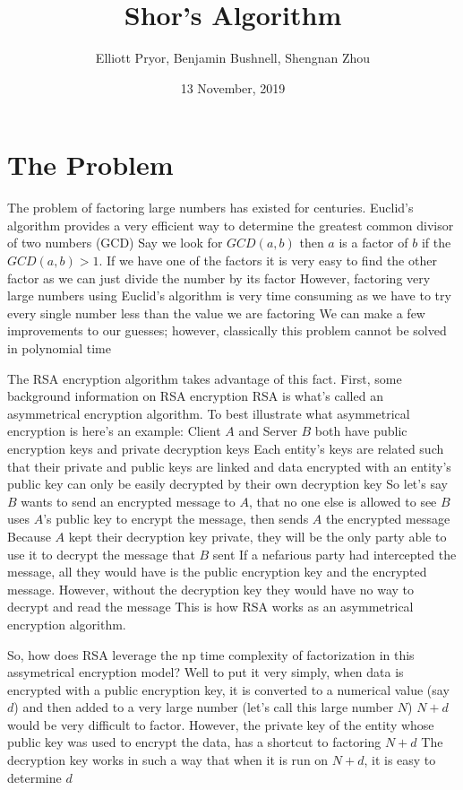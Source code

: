 \documentclass[a4paper]{article}
\title{Shor's Algorithm}
\author{Elliott Pryor, Benjamin Bushnell, Shengnan Zhou}
\date{13 November, 2019}
\begin{document}
\maketitle %

\section{The Problem}

The problem of factoring large numbers has existed for centuries. Euclid's algorithm provides a very efficient way to determine the greatest common divisor of two numbers (GCD)
 Say we look for $GCD(a,b)$ then $a$ is a factor of $b$ if the $GCD(a, b) > 1$. If we have one of the factors
 it is very easy to find the other factor as we can just divide the number by its factor
 However, factoring very large numbers using Euclid's algorithm is very time consuming as we have to try every single number less than the value we are factoring
 We can make a few improvements to our guesses; however, classically this problem cannot be solved in polynomial time


The RSA encryption algorithm takes advantage of this fact. First, some background information on RSA encryption
 RSA is what's called an asymmetrical encryption algorithm. To best illustrate what asymmetrical encryption is
 here's an example: Client $A$ and Server $B$ both have public encryption keys and private decryption keys
 Each entity's keys are related such that their private and public keys are linked
 and data encrypted with an entity's public key can only be easily decrypted by their own decryption key
 So let's say $B$ wants to send an encrypted message to $A$, that no one else is allowed to see
 $B$ uses $A$'s public key to encrypt the message, then sends $A$ the encrypted message
 Because $A$ kept their decryption key private, they will be the only party able to use it to decrypt the message that $B$ sent
 If a nefarious party had intercepted the message, all they would have is the public encryption key
 and the encrypted message. However, without the decryption key they would have no way to decrypt and read the message
 This is how RSA works as an asymmetrical encryption algorithm. \cite{ytRSA}




So, how does RSA leverage the np time complexity of factorization in this assymetrical encryption model? Well
 to put it very simply, when data is encrypted with a public encryption key, it is converted to a numerical value (say $d$) and then added to a very large number (let's call this large number $N$)
 $N+d$ would be very difficult to factor. However, the private key of the entity
 whose public key was used to encrypt the data, has a shortcut to factoring $N+d$
 The decryption key works in such a way that when it is run on $N + d$, it is easy to determine $d$
 \cite{ytRSA}
\end{document}
